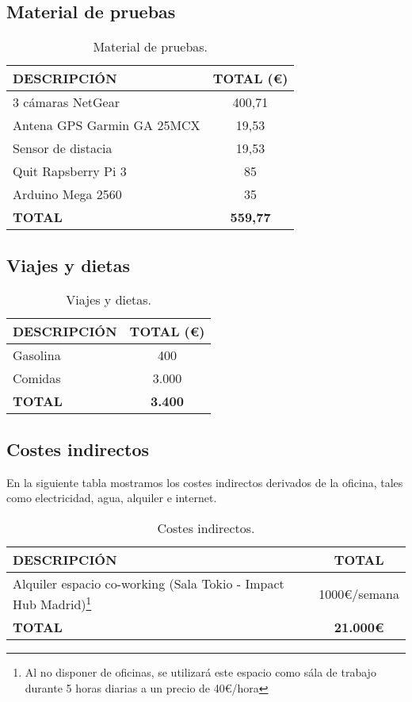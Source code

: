 \documentclass[10pt,a4paper,oldfontcommands]{plantillaDPDS}
\begin{document}
\subsection{Material de pruebas}
\begin{table}[H]
\begin{center}
\begin{tabular}{l c}
\textbf{DESCRIPCIÓN} & \textbf{TOTAL (\euro)}\\ \hline \hline
3 cámaras NetGear & 400,71\\
Antena GPS Garmin GA 25MCX & 19,53\\
Sensor de distacia & 19,53\\
Quit Rapsberry Pi 3 & 85\\
Arduino Mega 2560 & 35\\ \hline \hline
\textbf{TOTAL} & \textbf{559,77}\\ \hline
\end{tabular}
\caption{Material de pruebas.}
\label{tab:pruebas}
\end{center}
\end{table}





\subsection{Viajes y dietas}
\begin{table}[H]
\begin{center}
\begin{tabular}{l c}
\textbf{DESCRIPCIÓN} & \textbf{TOTAL (\euro)}\\ \hline \hline
Gasolina & 400\\
Comidas & 3.000\\ \hline \hline
\textbf{TOTAL} & \textbf{3.400}\\ \hline
\end{tabular}
\caption{Viajes y dietas.}
\label{tab:viajes}
\end{center}
\end{table}


\subsection{Costes indirectos}
En la siguiente tabla mostramos los costes indirectos derivados de la oficina, tales como electricidad, agua, alquiler e internet.
\begin{table}[H]
\begin{center}
\begin{tabular}{l c}
\textbf{DESCRIPCIÓN} & \textbf{TOTAL}\\ \hline \hline
Alquiler espacio co-working (Sala Tokio - Impact Hub Madrid)\footnote{Al no disponer de oficinas, se utilizará este espacio como sála de trabajo durante 5 horas diarias a un precio de 40\euro/hora} & 1000\euro/semana\\ \hline \hline
\textbf{TOTAL} & \textbf{21.000\euro}\\ \hline
\end{tabular}
\caption{Costes indirectos.}
\label{tab:indirectos}
\end{center}
\end{table}
\end{document}
